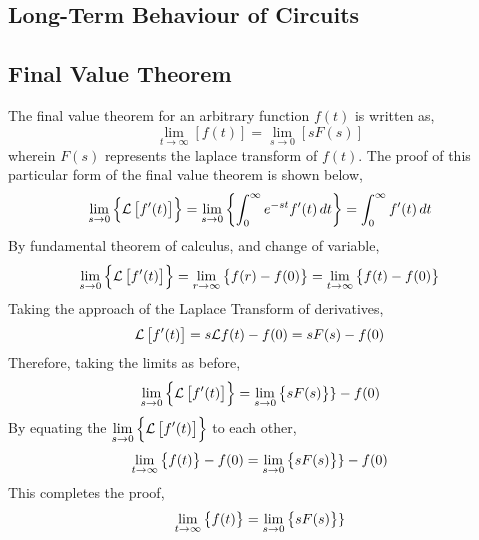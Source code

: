 \documentclass[a4paper, 12pt]{report}
\begin{document}
\begin{center}
\chapter{Long-Term Behaviour of Circuits}
\begin{comment}
\end{comment}
\section{Final Value Theorem}
\begin{comment}
\end{comment}
The final value theorem for an arbitrary function $f(t)$ is written as,
$$\lim_{t\to\infty}[f(t)] = \lim_{s\to0}[sF(s)]$$
wherein $F(s)$ represents the laplace transform of $f(t)$. The proof of this particular form of the final value theorem is shown below,
$$\lim_{s\to0}\left\{\mathcal{L}\left[f'(t)\right]\right\} = \lim_{s\to0}\left\{\int^{\infty}_{0}e^{-st}f'(t)\,dt\right\} = \int^{\infty}_{0}f'(t)\,dt $$
By fundamental theorem of calculus, and change of variable,
$$\lim_{s\to0}\left\{\mathcal{L}\left[f'(t)\right]\right\} = \lim_{r\to\infty}\left\{f(r) - f(0)\right\} = \lim_{t\to\infty}\left\{f(t) - f(0)\right\}$$
Taking the approach of the Laplace Transform of derivatives,
$$\mathcal{L}\left[f'(t)\right] = s\mathcal{L}{f(t)} - f(0) = sF(s) - f(0)$$
Therefore, taking the limits as before,
$$\lim_{s\to0}\left\{\mathcal{L}\left[f'(t)\right]\right\} = \lim_{s\to0}\left\{sF(s)\right\}\} - f(0)$$
By equating the $\displaystyle{\lim_{s\to0}\left\{\mathcal{L}\left[f'(t)\right]\right\}}$ to each other,
$$\lim_{t\to\infty}\left\{f(t)\right\} - f(0) = \lim_{s\to0}\left\{sF(s)\right\}\} - f(0)$$
This completes the proof,
$$\lim_{t\to\infty}\left\{f(t)\right\} = \lim_{s\to0}\left\{sF(s)\right\}\}$$

\end{center}
\end{document}
